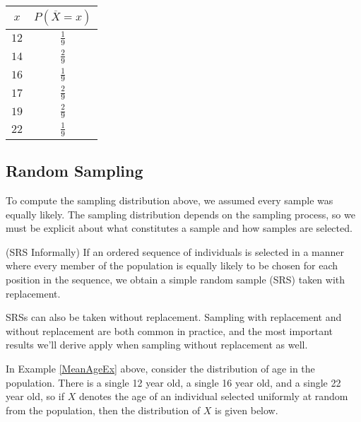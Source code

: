 \begin{examp}
\vspace{-1em}
\begin{center}
    \begin{minipage}{.45\textwidth}
        \centering
      \renewcommand*{\arraystretch}{1.35}
\begin{tabular}{c|c}
$x$ & $P(\overline{X} = x)$ \\
\hline
$12$ & $\frac{1}{9}$ \\
$14$ & $\frac{2}{9}$ \\
$16$ & $\frac{1}{9}$ \\
$17$ & $\frac{2}{9}$ \\
$19$ & $\frac{2}{9}$ \\
$22$ & $\frac{1}{9}$
\end{tabular}
\renewcommand*{\arraystretch}{1}
\vspace{0.25em}
    \end{minipage}%
    \begin{minipage}{0.5\textwidth}
        \centering
{}
\end{minipage}
\end{center}
\end{examp}

\subsection*{Random Sampling}

To compute the sampling distribution above, we assumed every sample was equally likely. The sampling distribution depends on the sampling process, so we must be explicit about what constitutes a sample and how samples are selected.

\begin{defn} (SRS Informally) If an ordered sequence of individuals is selected in a manner where every member of the population is equally likely to be chosen for each position in the sequence, we obtain a simple random sample (SRS) taken with replacement.
\end{defn}
\rmk SRSs can also be taken without replacement. Sampling with replacement and without replacement are both common in practice, and the most important results we'll derive apply when sampling without replacement as well.
\par
In Example \ref{MeanAgeEx} above, consider the distribution of age in the population. There is a single 12 year old, a single 16 year old, and a single 22 year old, so if $X$ denotes the age of an individual selected uniformly at random from the population, then the distribution of $X$ is given below.

